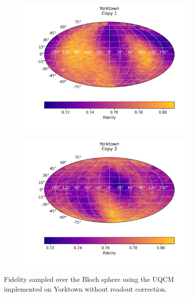 \begin{figure}[H]
    \centering
    \begin{subfigure}{.5\textwidth}
      \centering
      \includegraphics[width=\textwidth]{Figures/UQCM/IBM/FullSphere/results_ibmqx2_copy1.png}
    \end{subfigure}%
    \begin{subfigure}{.5\textwidth}
      \centering
      \includegraphics[width=\textwidth]{Figures/UQCM/IBM/FullSphere/results_ibmqx2_copy2.png}
    \end{subfigure}
\caption{Fidelity sampled over the Bloch sphere using the UQCM implemented on Yorktown without readout correction.}
\end{figure}


